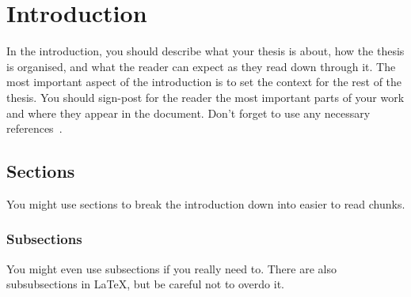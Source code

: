 
\chapter{Introduction}

In the introduction, you should describe what your thesis is about, how the
thesis is organised, and what the reader can expect as they read down through
it.
The most important aspect of the introduction is to set the context for the
rest of the thesis.
You should sign-post for the reader the most important parts of your work and
where they appear in the document.
Don't forget to use any necessary references~\cite{einstein}.

\lipsum[1-2]

\section{Sections}
You might use sections to break the introduction down into easier to read
chunks.
\lipsum[1-2]

\subsection{Subsections}
You might even use subsections if you really need to.
There are also subsubsections in \LaTeX, but be careful not to overdo it.

\lipsum[1-2]